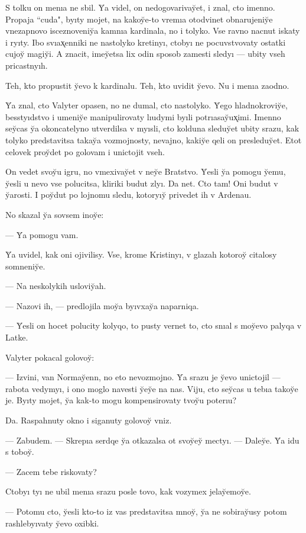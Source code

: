 \documentclass[10pt]{book}
\begin{document}
S tolku on menıa ne sbil. Y̆a videl, on nedogovarivay̆et, i znal, cto imenno. Propaja ``cuda", byıty mojet, na kakoy̆e-to vremıa otodvinet obnarujeniy̆e vnezapnovo isceznoveniy̆a kamnıa kardinala, no i tolyko. Vse ravno nacnut iskaty i ryıty. Ibo svıax̨enniki ne nastolyko kretinyı, ctobyı ne pocuvstvovaty ostatki cujoy̆ magiy̆i. A znacit, imey̆etsa lix odin sposob zamesti sledyı — ubity vseh pricastnyıh.

Teh, kto propustit y̆evo k kardinalu. Teh, kto uvidit y̆evo. Nu i menıa zaodno.

Y̆a znal, cto Valyter opasen, no ne dumal, cto nastolyko. Y̆ego hladnokroviy̆e, besstyıdstvo i umeniy̆e manipulirovaty lıudymi byıli potrıasay̆ux̨imi. Imenno sey̆cas y̆a okoncatelyno utverdilsa v myısli, cto kolduna sleduy̆et ubity srazu, kak tolyko predstavitsa takay̆a vozmojnosty, nevajno, kakiy̆e qeli on presleduy̆et. Etot celovek proy̆det po golovam i unictojit vseh.

On vedet svoy̆u igru, no vmexivay̆et v ney̆e Bratstvo. Y̆esli y̆a pomogu y̆emu, y̆esli u nevo vse polucitsa, kliriki budut zlyı. Da net. Cto tam! Oni budut v y̆arosti. I poy̆dut po lojnomu sledu, kotoryıy̆ privedet ih v Ardenau.

No skazal y̆a sovsem inoy̆e:

— Y̆a pomogu vam.

Y̆a uvidel, kak oni ojivilisy. Vse, krome Kristinyı, v glazah kotoroy̆ citalosy somneniy̆e.

— Na neskolykih usloviy̆ah.

— Nazovi ih, — predlojila moy̆a byıvxay̆a naparniqa.

— Y̆esli on hocet polucity kolyqo, to pusty vernet to, cto snıal s moy̆evo palyqa v Latke.

Valyter pokacal golovoy̆:

— Izvini, van Normay̆enn, no eto nevozmojno. Y̆a srazu je y̆evo unictojil — rabota vedymyı, i ono moglo navesti y̆ey̆e na nas. Viju, cto sey̆cas u tebıa takoy̆e je. Byıty mojet, y̆a kak-to mogu kompensirovaty tvoy̆u poterıu?

Da. Raspahnuty okno i siganuty golovoy̆ vniz.

— Zabudem. — Skrepıa serdqe y̆a otkazalsa ot svoy̆ey̆ mectyı. — Daley̆e. Y̆a idu s toboy̆.

— Zacem tebe riskovaty?

Ctobyı tyı ne ubil menıa srazu posle tovo, kak vozymex jelay̆emoy̆e.

— Potomu cto, y̆esli kto-to iz vas predstavitsa mnoy̆, y̆a ne sobiray̆usy potom rashlebyıvaty y̆evo oxibki.
\end{document}

